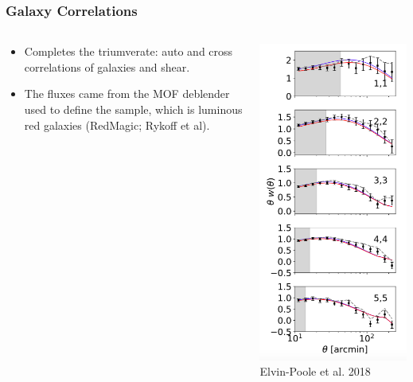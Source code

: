 \documentclass[aspectratio=169]{beamer}
\begin{document}
\frame
{

    \frametitle{Galaxy Correlations}


    \begin{columns}
        \begin{column}{0.5\textwidth}
            \begin{itemize}

                \item Completes the triumverate:  auto and cross correlations
                    of galaxies and shear.

                \item The fluxes came from the MOF deblender used to define
                    the sample, which is luminous red galaxies 
                    (RedMagic; Rykoff et al).

            \end{itemize}

        \end{column}
        \begin{column}{0.5\textwidth}
            \centering
                \includegraphics[height=0.9\textheight]{galclustering-fig7a.png}
                \newline
                {\tiny Elvin-Poole et al. 2018}
        \end{column}


\end{columns}}
\end{document}
